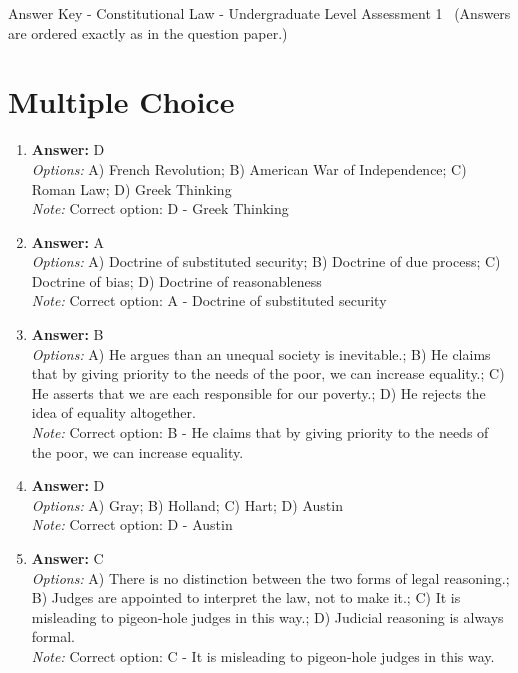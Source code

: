 \documentclass[12pt]{article}
\begin{document}
\begin{center}
Answer Key - Constitutional Law - Undergraduate Level Assessment 1 \
\small (Answers are ordered exactly as in the question paper.)
\end{center}

\section*{Multiple Choice}
\begin{enumerate}[label=\arabic*.]
\item \textbf{Answer:} D
\\ \textit{Options:} A) French Revolution; B) American War of Independence; C) Roman Law; D) Greek Thinking
\\ \textit{Note:} Correct option: D - Greek Thinking
\item \textbf{Answer:} A
\\ \textit{Options:} A) Doctrine of substituted security; B) Doctrine of due process; C) Doctrine of bias; D) Doctrine of reasonableness
\\ \textit{Note:} Correct option: A - Doctrine of substituted security
\item \textbf{Answer:} B
\\ \textit{Options:} A) He argues than an unequal society is inevitable.; B) He claims that by giving priority to the needs of the poor, we can increase equality.; C) He asserts that we are each responsible for our poverty.; D) He rejects the idea of equality altogether.
\\ \textit{Note:} Correct option: B - He claims that by giving priority to the needs of the poor, we can increase equality.
\item \textbf{Answer:} D
\\ \textit{Options:} A) Gray; B) Holland; C) Hart; D) Austin
\\ \textit{Note:} Correct option: D - Austin
\item \textbf{Answer:} C
\\ \textit{Options:} A) There is no distinction between the two forms of legal reasoning.; B) Judges are appointed to interpret the law, not to make it.; C) It is misleading to pigeon-hole judges in this way.; D) Judicial reasoning is always formal.
\\ \textit{Note:} Correct option: C - It is misleading to pigeon-hole judges in this way.
\end{enumerate}
\end{document}
